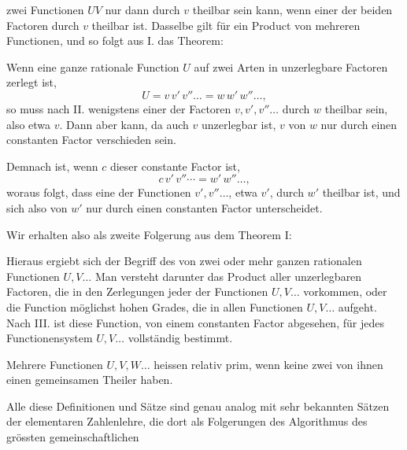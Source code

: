 
zwei Functionen $UV$ nur dann durch $v$ theilbar sein kann, wenn
einer der beiden Factoren durch $v$ theilbar ist. Dasselbe gilt
für ein Product von mehreren Functionen, und so folgt aus I.
das Theorem:


Wenn eine ganze rationale Function $U$ auf zwei Arten in
unzerlegbare Factoren zerlegt ist,
\[
U = v\,v'\,v''\dots = w\,w'\,w''\dots,
\]
so muss nach II. wenigstens einer der Factoren $v, v', v''\dots$
durch $w$ theilbar sein, also etwa $v$. Dann aber kann, da auch
$v$ unzerlegbar ist, $v$ von $w$ nur durch einen constanten Factor
verschieden sein.

Demnach ist, wenn $c$ dieser constante Factor ist,
\[
c\,v'\,v''\cdots = w'\,w''\dots,
\]
woraus folgt, dass eine der Functionen $v', v''\dots$, etwa $v'$, durch
$w'$ theilbar ist, und sich also von $w'$ nur durch einen constanten
Factor unterscheidet.

Wir erhalten also als zweite Folgerung aus dem Theorem I:


Hieraus ergiebt sich der Begriff des  von zwei oder mehr ganzen rationalen Functionen
$U, V\dots$ Man versteht darunter das Product aller
unzerlegbaren Factoren, die in den Zerlegungen jeder der Functionen
$U, V\dots$ vorkommen, oder die Function möglichst hohen
Grades, die in allen Functionen $U, V\dots$ aufgeht. Nach III. ist
diese Function, von einem constanten Factor abgesehen, für jedes
Functionensystem $U, V\dots$ vollständig bestimmt.

Mehrere Functionen $U, V, W\dots$ heissen relativ prim, wenn
keine zwei von ihnen einen gemeinsamen Theiler haben.

Alle diese Definitionen und Sätze sind genau analog mit
sehr bekannten Sätzen der elementaren Zahlenlehre, die dort als
Folgerungen des Algorithmus des grössten gemeinschaftlichen

